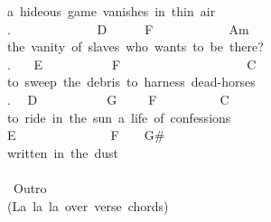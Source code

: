 {a\ hideous\ game\ vanishes\ in\ thin\ air\\
. \ \ \ \ \ \ \ \ \ \ \ \ \ D\ \ \ \ \ \ F\ \ \ \ \ \ \ \ \ \ \ \ Am\ \ \\
the\ vanity\ of\ slaves\ who\ wants\ to\ be\ there?\\
. \ \ \ E\ \ \ \ \ \ \ \ \ \ \ F\ \ \ \ \ \ \ \ \ \ \ \ \ \ \ \ \ \ \ \ C\\
to\ sweep\ the\ debris\ to\ harness\ dead-horses\\
. \ \ D\ \ \ \ \ \ \ \ \ \ \ G\ \ \ \ \ F\ \ \ \ \ \ \ \ \ \ C\\
to\ ride\ in\ the\ sun\ a\ life\ of\ confessions\\
E\ \ \ \ \ \ \ \ \ \ \ \ \ \ \ F\ \ \ \ G\#\ \ \\
written\ in\ the\ dust\\
\\
\lbrack\ Outro\rbrack\\
(La\ la\ la\ over\ verse\ chords)\ }
